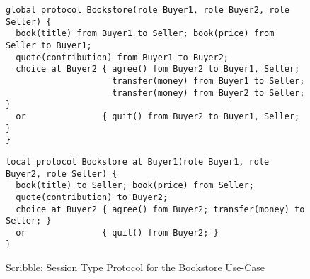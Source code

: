 \begin{figure}[t]
\begin{lstlisting}
global protocol Bookstore(role Buyer1, role Buyer2, role Seller) {
  book(title) from Buyer1 to Seller; book(price) from Seller to Buyer1;
  quote(contribution) from Buyer1 to Buyer2;
  choice at Buyer2 { agree() fom Buyer2 to Buyer1, Seller;
                     transfer(money) from Buyer1 to Seller;
                     transfer(money) from Buyer2 to Seller; }
  or               { quit() from Buyer2 to Buyer1, Seller;  }
}
\end{lstlisting}


\begin{lstlisting}
local protocol Bookstore at Buyer1(role Buyer1, role Buyer2, role Seller) {
  book(title) to Seller; book(price) from Seller;
  quote(contribution) to Buyer2;
  choice at Buyer2 { agree() fom Buyer2; transfer(money) to Seller; }
  or               { quit() from Buyer2; }
}
\end{lstlisting}
\vspace{-5mm}
\caption{Scribble: Session Type Protocol for the Bookstore Use-Case}
\label{fig:scribble_bs}
\vspace{-6mm}
\end{figure}
